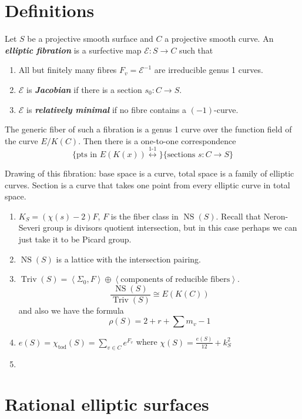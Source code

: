 \section{Definitions}

\begin{defn}
	Let $S$ be a projective smooth surface and $C$ a projective smooth curve. An \textit{\textbf{ elliptic fibration}} is a surfective map $\mathcal{E}:S\to C$ such that
	\begin{enumerate}[label=(\roman*)]
		\item All but finitely many fibres $F_{v}=\mathcal{E}^{-1}$ are irreducible genus 1 curves.
		\item $\mathcal{E}$ is \textit{\textbf{Jacobian}} if there is a section $s_0:C\to  S$.
		\item $\mathcal{E}$ is \textit{\textbf{relatively minimal}} if no fibre contains a $(-1)$-curve.
	\end{enumerate}
\end{defn}

The generic fiber of such a fibration is a genus 1 curve over the function field of the curve $E/K(C)$. Then there is a one-to-one correspondence
\[\{\text{pts in $E(K(x))$}\overset{\text{1-1} }{\longleftrightarrow }\} \{\text{sections $s:C\to S$} \}\]

Drawing of this fibration: base space is a curve, total space is a family of elliptic curves. Section is a curve that takes one point from every elliptic curve in total space.

\begin{enumerate}
	\item $K_S=(\chi(s)-2)F$,  $F$ is the fiber class in $\operatorname{NS}(S)$. Recall that Neron-Severi group is divisors quotient intersection, but in this case perhaps we can just take it to be Picard group.
\item $\operatorname{NS}(S)$ is a lattice with the intersection pairing.
	\item $\operatorname{Triv}(S)=\left<\Sigma_0,F\right> \oplus \left<\text{components of reducible fibers} \right> $.
		\[\dfrac{\operatorname{NS}(S)}{\operatorname{Triv}(S)}\cong E(K(C))\]
		and also we have the formula
		\[\rho(S)=2+r+\sum m_v-1\]
	\item $e(S)=\chi_{\text{tod} }(S)=\sum_{v\in C}e^{F_v}$ where $\chi(S)=\frac{e(S)}{12}+k^2_S$
	\item 
\end{enumerate}

\section{Rational elliptic surfaces}

